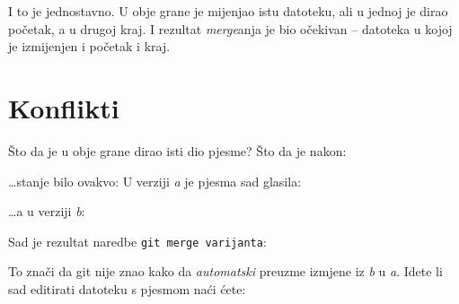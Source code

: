 I to je jednostavno.
U obje grane je mijenjao istu datoteku, ali u jednoj je dirao početak, a u drugoj kraj.
I rezultat \emph{merge}anja je bio očekivan -- datoteka u kojoj je izmijenjen i početak i kraj.

\section*{Konflikti}

Što da je u obje grane dirao isti dio pjesme?
Što da je nakon:



\dots{}stanje bilo ovakvo:
U verziji \emph a je pjesma sad glasila:


\dots{}a u verziji \emph b:


Sad je rezultat naredbe \verb+git merge varijanta+:



To znači da git nije znao kako da \emph{automatski} preuzme izmjene iz \emph b u \emph a.
Idete li sad editirati datoteku s pjesmom naći ćete:


